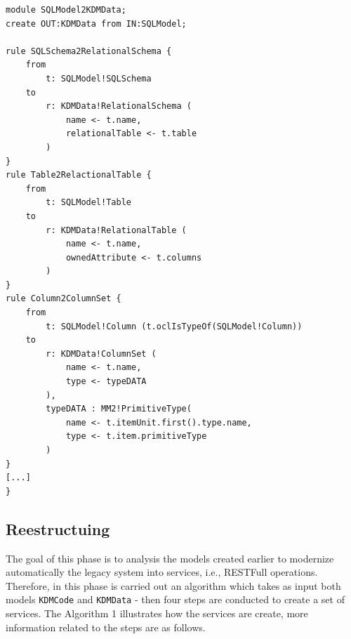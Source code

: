 \documentclass[a4paper,twoside]{article}
\begin{document}
\begin{lstlisting}[caption=Chunk of SQLModel2KDMData, label=list:KDMData, frame=lrtb, basicstyle=\tiny]
module SQLModel2KDMData;
create OUT:KDMData from IN:SQLModel;

rule SQLSchema2RelationalSchema {
	from 
		t: SQLModel!SQLSchema
	to
		r: KDMData!RelationalSchema (	
			name <- t.name,
			relationalTable <- t.table
		)
}
rule Table2RelactionalTable {
	from
		t: SQLModel!Table
	to
		r: KDMData!RelationalTable (
			name <- t.name,
			ownedAttribute <- t.columns
		)
}
rule Column2ColumnSet {	
	from
		t: SQLModel!Column (t.oclIsTypeOf(SQLModel!Column))
	to
		r: KDMData!ColumnSet (
			name <- t.name,
			type <- typeDATA
		),
		typeDATA : MM2!PrimitiveType(
			name <- t.itemUnit.first().type.name,
			type <- t.item.primitiveType
		)
}
[...]
}

\end{lstlisting}


\subsection{Reestructuing} %
\label{sub:restructuing}


The goal of this phase is to analysis the models created earlier to modernize automatically the legacy system into services, i.e., RESTFull operations. Therefore, in this phase is carried out an algorithm which takes as input both models \texttt{KDMCode} and \texttt{KDMData} - then four steps are conducted to create a set of services. The Algorithm 1 illustrates how the services are create, more information related to the steps are as follows.

\end{document}
